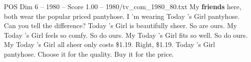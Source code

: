 \begin{textsample}{POS Dim 6 – 1980 – Score 1.00 – 1980/tv\_com\_1980\_80.txt}  \label{ex:f6_pos_057}
My \textbf{friends} here, both wear the popular priced pantyhose.
I 'm wearing Today 's Girl pantyhose.
Can you tell the difference?
Today 's Girl is beautifully sheer.
So are ours.
My Today 's Girl feels so comfy.
So do ours.
My Today 's Girl fits so well.
So do ours.
My Today 's Girl all sheer only costs \$1.19.
Right, \$1.19.
Today 's Girl pantyhose.
Choose it for the quality.
Buy it for the price.

\end{textsample}
